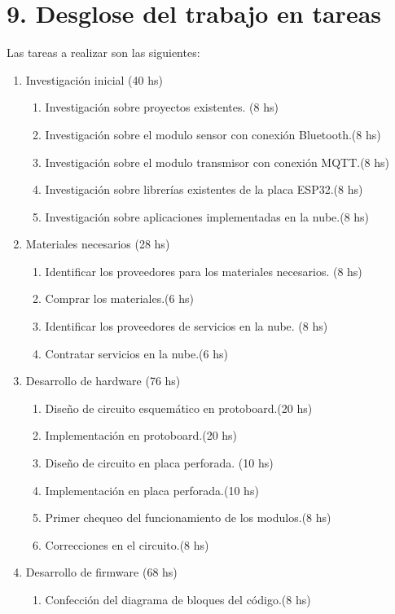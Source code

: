 \documentclass[
11pt, %
]{charter}
\begin{document}
\section{9. Desglose del trabajo en tareas}
\label{sec:wbs}

Las tareas a realizar son las siguientes:

\begin{enumerate}
\item Investigación inicial	(40 hs)
	\begin{enumerate}
	\item Investigación sobre proyectos existentes.	(8 hs)
	\item Investigación sobre el modulo sensor con conexión Bluetooth.(8 hs)
	\item Investigación sobre el modulo transmisor con conexión MQTT.(8 hs)
	\item Investigación sobre librerías existentes de la placa ESP32.(8 hs)
	\item Investigación sobre aplicaciones implementadas en la nube.(8 hs)
	\end{enumerate}
\item Materiales necesarios	(28 hs)
	\begin{enumerate}
	\item Identificar los proveedores para los materiales necesarios. (8 hs)
	\item Comprar los materiales.(6 hs)
	\item Identificar los proveedores de servicios en la nube. (8 hs)
	\item Contratar servicios en la nube.(6 hs)
	\end{enumerate}
\item Desarrollo de hardware (76 hs)
	\begin{enumerate}
	\item Diseño de circuito esquemático en protoboard.(20 hs)
	\item Implementación en protoboard.(20 hs)
	\item Diseño de circuito en placa perforada.	(10 hs)
	\item Implementación en placa perforada.(10 hs)
	\item Primer chequeo del funcionamiento de los modulos.(8 hs)
	\item Correcciones en el circuito.(8 hs)
	\end{enumerate}
\item Desarrollo de firmware (68 hs)
	\begin{enumerate}
	\item Confección del diagrama de bloques del código.(8 hs)

\end{enumerate}
\end{enumerate}
\end{document}
